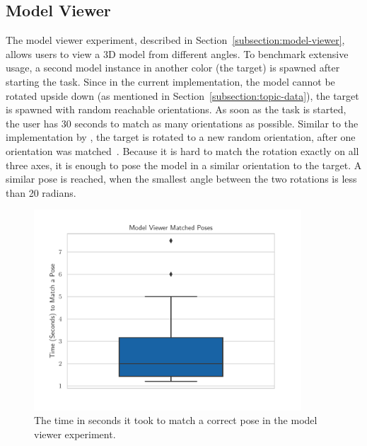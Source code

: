 \subsection{Model Viewer}\label{section:eval-res-mv}

The model viewer experiment, described in Section~\ref{subsection:model-viewer}, allows users to view a \ac{3D} model from different angles. To benchmark extensive usage, a second model instance in another color (the target) is spawned after starting the task. Since in the current implementation, the model cannot be rotated upside down (as mentioned in Section~\ref{subsection:topic-data}), the target is spawned with random reachable orientations.
As soon as the task is started, the user has 30 seconds to match as many orientations as possible. Similar to the implementation by \citeauthor{Katzakis.2010}, the target is rotated to a new random orientation, after one orientation was matched~\cite[140]{Katzakis.2010}.
Because it is hard to match the rotation exactly on all three axes, it is enough to pose the model in a similar orientation to the target. A similar pose is reached, when the smallest angle between the two rotations is less than 20 radians.

\begin{figure}[H]
  \centering
  \includegraphics[width=10cm]{figures/evaluation/eval_exp_mv.pdf}
  \caption[Model viewer experiment results]{The time in seconds it took to match a correct pose in the model viewer experiment.}\label{fig:eval-exp-mv}
\end{figure}

